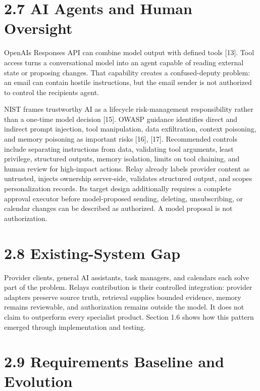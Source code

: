 \documentclass[
]{report}
\begin{document}
\section{2.7 AI Agents and Human
Oversight}\label{27-ai-agents-and-human-oversight}

OpenAI\textquotesingle s Responses API can combine model output with
defined tools {[}13{]}. Tool access turns a conversational model into an
agent capable of reading external state or proposing changes. That
capability creates a confused-deputy problem: an email can contain
hostile instructions, but the email sender is not authorized to control
the recipient\textquotesingle s agent.

NIST frames trustworthy AI as a lifecycle risk-management responsibility
rather than a one-time model decision {[}15{]}. OWASP guidance
identifies direct and indirect prompt injection, tool manipulation, data
exfiltration, context poisoning, and memory poisoning as important risks
{[}16{]}, {[}17{]}. Recommended controls include separating instructions
from data, validating tool arguments, least privilege, structured
outputs, memory isolation, limits on tool chaining, and human review for
high-impact actions. Relay already labels provider content as untrusted,
injects ownership server-side, validates structured output, and scopes
personalization records. Its target design additionally requires a
complete approval executor before model-proposed sending, deleting,
unsubscribing, or calendar changes can be described as authorized. A
model proposal is not authorization.

\section{2.8 Existing-System Gap}\label{28-existing-system-gap}

Provider clients, general AI assistants, task managers, and calendars
each solve part of the problem. Relay\textquotesingle s contribution is
their controlled integration: provider adapters preserve source truth,
retrieval supplies bounded evidence, memory remains reviewable, and
authorization remains outside the model. It does not claim to outperform
every specialist product. Section 1.6 shows how this pattern emerged
through implementation and testing.

\section{2.9 Requirements Baseline and
Evolution}\label{29-requirements-baseline-and-evolution}
\end{document}
